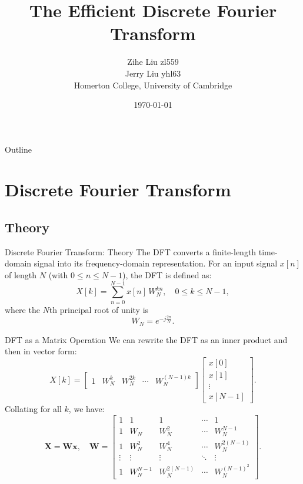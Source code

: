 \documentclass[10pt]{beamer}
\title{The Efficient Discrete Fourier Transform}
\author{Zihe Liu \quad zl559 \\ Jerry Liu \quad yhl63 \\ Homerton College, University of Cambridge}
\date{\today}
\begin{document}
\frame{\titlepage}

\begin{frame}{Outline}
  \tableofcontents
\end{frame}

\section{Discrete Fourier Transform}

\subsection{Theory}
\begin{frame}{Discrete Fourier Transform: Theory}
  The DFT converts a finite-length time-domain signal into its frequency-domain representation. For an input signal \(x[n]\) of length \(N\) (with \(0 \le n \le N-1\)), the DFT is defined as:
  \[
  X[k] = \sum_{n=0}^{N-1} x[n]\, W_N^{kn}, \quad 0 \le k \le N-1,
  \]
  where the \(N\)th principal root of unity is
  \[
  W_N = e^{-j\frac{2\pi}{N}}.
  \]
\end{frame}

\begin{frame}{DFT as a Matrix Operation}
  We can rewrite the DFT as an inner product and then in vector form:
  \[
  X[k] = \begin{bmatrix} 1 & W_N^k & W_N^{2k} & \cdots & W_N^{(N-1)k} \end{bmatrix}
  \begin{bmatrix} x[0] \\ x[1] \\ \vdots \\ x[N-1] \end{bmatrix}.
  \]
  Collating for all \(k\), we have:
  \[
  \bm{X} = \bm{W}\bm{x}, \quad
  \bm{W} = 
  \begin{bmatrix}
    1 & 1 & 1 & \cdots & 1 \\
    1 & W_N & W_N^2 & \cdots & W_N^{N-1} \\
    1 & W_N^2 & W_N^4 & \cdots & W_N^{2(N-1)} \\
    \vdots & \vdots & \vdots & \ddots & \vdots \\
    1 & W_N^{N-1} & W_N^{2(N-1)} & \cdots & W_N^{(N-1)^2}
  \end{bmatrix}.
  \]
\end{frame}
\end{document}

